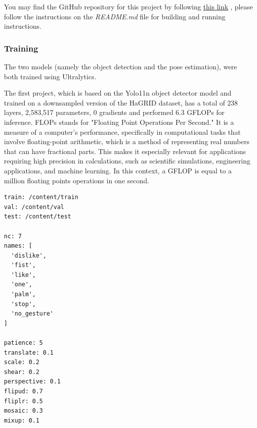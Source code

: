 \documentclass[12pt]{article}
\begin{document}
You may find the GitHub repository for this project by following \href{https://github.com/rodriguegaspard/smallhands}{\underline{this link}}  , please follow the instructions on the \textit{README.md} file for building and running instructions. 
\subsubsection{Training}

The two models (namely the object detection and the pose estimation), were both trained using Ultralytics.

The first project, which is based on the Yolo11n object detector model and trained on a downsampled version of the HaGRID dataset, has a total of 238 layers, 2,583,517 parameters, 0 gradients and performed 6.3 GFLOPs for inference. FLOPs stands for "Floating Point Operations Per Second." It is a measure of a computer's performance, specifically in computational tasks that involve floating-point arithmetic, which is a method of representing real numbers that can have fractional parts. This makes it especially relevant for applications requiring high precision in calculations, such as scientific simulations, engineering applications, and machine learning. In this context, a GFLOP is equal to a million floating points operations in one second.

\clearpage

\begin{lstlisting}[style=yaml, caption=The YAML file used for the object detection project]
train: /content/train
val: /content/val
test: /content/test

nc: 7
names: [
  'dislike', 
  'fist', 
  'like', 
  'one', 
  'palm', 
  'stop', 
  'no_gesture'
]

patience: 5
translate: 0.1
scale: 0.2
shear: 0.2
perspective: 0.1
flipud: 0.7
fliplr: 0.5
mosaic: 0.3
mixup: 0.1
\end{lstlisting}
\end{document}
